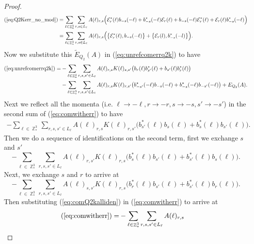 \documentclass[sn-mathphys, Numbered ,a4paper]{sn-jnl}%
\DeclareMathOperator{\Z}{\mathbb{Z}}
\theoremstyle{plain}
\theoremstyle{definition}
\theoremstyle{remark}
\theoremstyle{plain}
\theoremstyle{definition}
\theoremstyle{remark}
\begin{document}
\begin{proof}
\begin{align}
    (\ref{eq:Q2Kerr_no_mod})&=\sum\limits_{\ell \in \Z^3_*}\sum\limits_{r,s \in L_{\ell}}A(\ell)_{r,s}\Big( \mathcal{E}^*_{r}(\ell)b_{-s}(-\ell) +b^*_{-s}(-\ell) \mathcal{E}_{r}(\ell)+b_{-s}(-\ell) \mathcal{E}^*_{r}(\ell)+ \mathcal{E}_{r}(\ell)b^*_{-s}(-\ell) \Big)\nonumber\\
    &=\sum\limits_{\ell \in \Z^3_*}\sum\limits_{r,s \in L_{\ell}}A(\ell)_{r,s}\Big(\big\{\mathcal{E}^*_{r}(\ell), b_{-s}(-\ell)\big\} + \big\{\mathcal{E}_r(l), b^*_{-s}(-l)\big\}\Big).
\end{align}
Now we substitute this $\tilde E_{Q_2}(A) $ in (\ref{eq:unrefcomerrq2k}) to have
\begin{align}
    (\ref{eq:unrefcomerrq2k})=&-\sum\limits_{\ell \in \Z^3_*}\sum\limits_{r,s,s' \in L_{\ell}}A(\ell)_{r,s}
        K(\ell)_{s,s'}\big(b_{r}(\ell)b^*_{s'}(\ell)+b_{s'}(\ell)b^*_{r}(\ell) \big)\nonumber\\ &-\sum\limits_{\ell \in \Z^3_*}\sum\limits_{r,s,s' \in L_{\ell}}A(\ell)_{r,s} K(\ell)_{r,s'}\big(b^*_{-s'}(-\ell)b_{-s}(-\ell) + b^*_{-s}(-\ell)b_{-s'}(-\ell)\big) + E_{Q_2}(A).\label{eq:comwitherr}
\end{align}
Next we reflect all the momenta (i.e. $\ell\rightarrow -\ell,r\rightarrow -r,s\rightarrow -s,s'\rightarrow -s'$) in the second sum of (\ref{eq:comwitherr}) to have
\begin{align}
   -\sum\limits_{\ell \in \Z^3_*}\sum\limits_{r,s,s' \in L_{\ell}}A(\ell)_{r,s} K(\ell)_{r,s'}\big(b^*_{s'}(\ell)b_{s}(\ell) + b^*_{s}(\ell)b_{s'}(\ell)\big).
\end{align}
Then we do a sequence of identifications on the second term, first we exchange $s$ and $s'$ 
\begin{equation}
   -\sum\limits_{\ell \in \Z^3_*}\sum\limits_{r,s,s' \in L_{\ell}}A(\ell)_{r,s'} K(\ell)_{r,s}\big(b^*_{s}(\ell)b_{s'}(\ell) + b^*_{s'}(\ell)b_{s}(\ell)\big).
\end{equation}
Next, we exchange $s$ and $r$ to arrive at
\begin{equation}\label{eq:comQ2kalliden}
   -\sum\limits_{\ell \in \Z^3_*}\sum\limits_{r,s,s' \in L_{\ell}}A(\ell)_{s,s'} K(\ell)_{r,s}\big(b^*_{r}(\ell)b_{s'}(\ell) + b^*_{s'}(\ell)b_{r}(\ell)\big).
\end{equation}
Then substituting (\ref{eq:comQ2kalliden}) in (\ref{eq:comwitherr}) to arrive at
\begin{align}
    (\ref{eq:comwitherr})=&-\sum\limits_{\ell \in \Z^3_*}\sum\limits_{r,s,s' \in L_{\ell}}A(\ell)_{r,s}

\end{align}
\end{proof}
\end{document}

